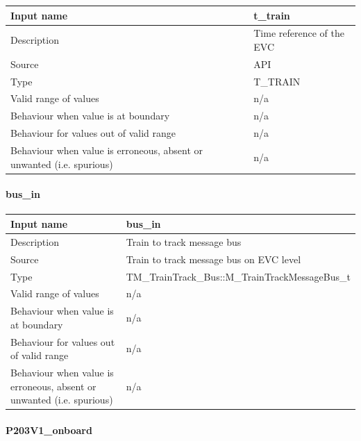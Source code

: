\begin{longtable}{p{}p{}}
\toprule
Input name				& t\_train\\
\midrule
Description				& Time reference of the EVC  \\
\midrule
Source					& API\\ 
\midrule
Type					& T\_TRAIN\\
\midrule
Valid range of values	& n/a \\
\midrule
Behaviour when value is at boundary	& n/a\\
\midrule
Behaviour for values out of valid range	& n/a\\
\midrule
Behaviour when value is erroneous, absent or unwanted (i.e. spurious) & n/a\\

\bottomrule


\end{longtable}


\paragraph{bus\_in}

\begin{longtable}{p{}p{}}
\toprule
Input name				& bus\_in\\
\midrule
Description				& Train to track message bus  \\
\midrule
Source					& Train to track message bus on EVC level\\ 
\midrule
Type					& TM\_TrainTrack\_Bus::M\_TrainTrackMessageBus\_t\\
\midrule
Valid range of values	& n/a \\
\midrule
Behaviour when value is at boundary	& n/a\\
\midrule
Behaviour for values out of valid range	& n/a\\
\midrule
Behaviour when value is erroneous, absent or unwanted (i.e. spurious) & n/a\\

\bottomrule


\end{longtable}




\paragraph{P203V1\_onboard}

